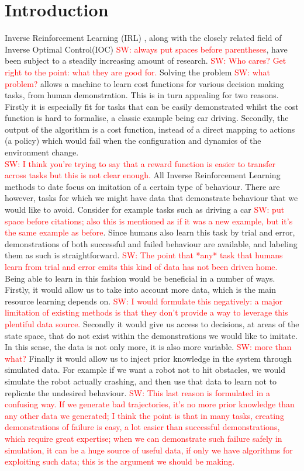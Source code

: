 \documentclass[letterpaper]{article}
\newcommand{\sw}[1]{\textcolor{red}{SW: #1}}
\begin{document}
\section{Introduction}
	Inverse Reinforcement Learning (IRL) \cite{ng2000algorithms}, along with the closely related field of Inverse Optimal Control(IOC) \sw{always put spaces before parentheses}, have been subject to a steadily increasing amount of research. \sw{Who cares? Get right to the point: what they are good for.} Solving the problem \sw{what problem?} allows a machine to learn cost functions for various decision making tasks, from human demonstration. This is in turn appealing for two reasons. Firstly it is especially fit for tasks that can be easily demonstrated whilst the cost function is hard to formalise, a classic example being car driving. Secondly, the output of the algorithm is a cost function, instead of a direct mapping to actions (a policy) which would fail when the configuration and dynamics of the environment change.\\ \sw{I think you're trying to say that a reward function is easier to transfer across tasks but this is not clear enough.}
	All Inverse Reinforcement Learning methods to date focus on imitation of a certain type of behaviour. There are however, tasks for which we might have data that demonstrate behaviour that we would like to avoid. Consider for example tasks such as driving a car\cite{abbeel2004apprenticeship} \sw{put space before citations; also this is mentioned as if it was a new example, but it's the same example as before}. Since humans also learn this task by trial and error, demonstrations of both successful and failed behaviour are available, and labeling them as such is straightforward. \sw{The point that *any* task that humans learn from trial and error emits this kind of data has not been driven home.} Being able to learn in this fashion would be beneficial in a number of ways. Firstly, it would allow us to take into account more data, which is the main resource learning depends on. \sw{I would formulate this negatively: a major limitation of existing methods is that they don't provide a way to leverage this plentiful data source.} Secondly it would give us access to decisions, at areas of the state space, that do not exist within the demonstrations we would like to imitate. In this sense, the data is not only more, it is also more variable. \sw{more than what?} Finally it would allow us to inject prior knowledge in the system through simulated data. For example if we want a robot not to hit obstacles, we would simulate the robot actually crashing, and then use that data to learn not to replicate the undesired behaviour. \sw{This last reason is formulated in a confusing way.  If we generate bad trajectories, it's no more prior knowledge than any other data we generated; I think the point is that in many tasks, creating demonstrations of failure is easy, a lot easier than successful demonstrations, which require great expertise; when we can demonstrate such failure safely in simulation, it can be a huge source of useful data, if only we have algorithms for exploiting such data; this is the argument we should be making.}
\end{document}
